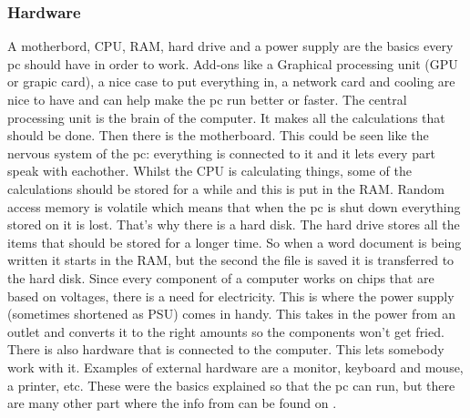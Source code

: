 \subsubsection{Hardware} \label{hardware}
A motherbord, CPU, RAM, hard drive and a power supply are the basics every pc should have in order to work.
Add-ons like a Graphical processing unit (GPU or grapic card), a nice case to put everything in, a network card and cooling are nice to have and can help make the pc run better or faster.
The central processing unit is the brain of the computer. It makes all the calculations that should be done.
Then there is the motherboard. This could be seen like the nervous system of the pc: everything is connected to it and it lets every part speak with eachother.
Whilst the CPU is calculating things, some of the calculations should be stored for a while and this is put in the RAM. Random access memory is volatile which means that when the pc is shut down everything stored on it is lost.
That's why there is a hard disk. The hard drive stores all the items that should be stored for a longer time. So when a word document is being written it starts in the RAM, but the second the file is saved it is transferred to the hard disk.
Since every component of a computer works on chips that are based on voltages, there is a need for electricity. This is where the power supply (sometimes shortened as PSU) comes in handy. This takes in the power from an outlet and converts it to the right amounts so the components won't get fried.
There is also hardware that is connected to the computer. This lets somebody work with it. Examples of external hardware are a monitor, keyboard and mouse, a printer, etc.
These were the basics explained so that the pc can run, but there are many other part where the info from can be found on \cite[https://edu.Fcfglobal.org/en/computerbasics/]{ComputerBasics}.

